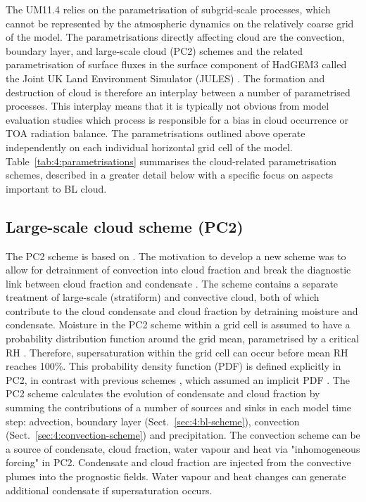 The UM11.4 relies on the parametrisation of subgrid-scale
processes,
which cannot be represented by the atmospheric dynamics on the relatively
coarse grid of the model. The parametrisations directly affecting cloud
are the convection, boundary layer, and large-scale cloud (PC2) schemes
and the related parametrisation of surface fluxes in the surface component of
HadGEM3 called the Joint UK Land Environment Simulator (JULES) \citep{best2011,clark2011}. The formation
and destruction of cloud is therefore an interplay between a number
of parametrised processes. This interplay means that it is typically not obvious from model
evaluation studies which process is responsible for a bias in cloud occurrence
or TOA radiation balance. The parametrisations outlined above operate independently
on each individual horizontal grid cell of the model.
Table~\ref{tab:4:parametrisations} summarises the cloud-related
parametrisation schemes, described in a greater detail below with a specific
focus on aspects important to BL cloud.

\subsection{Large-scale cloud scheme (PC2)}

The PC2 scheme is based on \cite{tiedtke1993}. The motivation to
develop a new scheme was to allow for detrainment of convection into cloud
fraction and break the diagnostic link between cloud fraction and condensate
\citep{umdp030}. The scheme contains a separate treatment of large-scale (stratiform) and
convective cloud, both of which contribute to the cloud condensate and cloud
fraction by detraining moisture and condensate. Moisture in the PC2 scheme
within a grid cell is assumed to have a probability distribution function around
the grid mean, parametrised by a critical RH \citep{gregory2002}.
Therefore, supersaturation within the grid cell can occur before mean
RH reaches 100\%. This probability density function (PDF) is defined explicitly in PC2, in
contrast with previous schemes \citep{tiedtke1993}, which assumed an implicit
PDF \citep{wilson2008a}.
The PC2 scheme calculates the evolution of condensate and cloud fraction by summing the
contributions of a number of sources and sinks in each model time step:
advection,  boundary layer (Sect.~\ref{sec:4:bl-scheme}),
convection (Sect.~\ref{sec:4:convection-scheme}) and precipitation.
The convection scheme can be a
source of condensate, cloud fraction, water vapour and heat via "inhomogeneous
forcing" in PC2. Condensate and cloud fraction are injected from the convective
plumes into the prognostic fields. Water vapour and heat changes can generate additional
condensate if supersaturation occurs.

